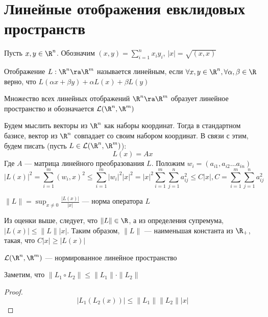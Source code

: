 
\section{Линейные отображения евклидовых пространств}
Пусть \(x, y \in \R^n\). Обозначим \((x, y) = \sum_{i = 1}^n x_iy_i\), \(|x| = \sqrt{(x, x)}\)

\begin{definition}
    Отображение \(L: \R^n \ra \R^m\) называется линейным, если \(\forall x, y \in \R^n, \forall \alpha, \beta \in \R\) верно, что \(L(\alpha x + \beta y) + \alpha L(x) + \beta L(y)\)
\end{definition}

\begin{note}
    Множество всех линейных отображений \(\R^n \ra \R^m\) образует линейное пространство и обозначается \(\mathcal{L}(\R^n, \R^m)\)
\end{note}

Будем мыслить векторы из \(\R^n\) как наборы координат. Тогда в стандартном базисе, вектор из \(\R^n\) совпадает со своим набором координат. В связи с этим, будем писать (пусть \(L \in \mathcal{L}(\R^n, \R^m)\)):
\[L(x) = Ax\]
Где \(A\) --- матрица линейного преобразования \(L\). Положим \(w_i = (a_{i1}, a_{i2} \dots a_{in})\)
\[|L(x)|^2 = \sum_{i = 1}^m (w_i, x)^2 \le \sum_{i = 1}^m|w_i|^2|x|^2 = |x|^2\sum_{i = 1}^m\sum_{j = 1}^n a_{ij}^2 \le C|x|, C = \sum_{i = 1}^m\sum_{j = 1}^n a_{ij}^2\]

\begin{definition}
    \(\|L\| = \sup_{x \ne 0} \frac{|L(x)|}{|x|}\) --- норма оператора \(L\)
\end{definition}

\begin{note}
    Из оценки выше, следует, что \(\|L\| \in \R\), а из определения супремума, \(|L(x)| \le \|L\||x|\). Таким образом, \(\|L\|\) --- наименьшая константа из \(\R_+\), такая, что \(C|x| \ge |L(x)|\)
\end{note}

\begin{corollary}
    \(\mathcal{L}(\R^n, \R^m)\) --- нормированное линейное пространство
\end{corollary}

\begin{note}
    Заметим, что \(\|L_1 \circ L_2\| \le \|L_1\|\cdot\|L_2\|\)
\end{note}
\begin{proof}
    \[|L_1(L_2(x))| \le \|L_1\|\|L_2\||x|\]
\end{proof}

